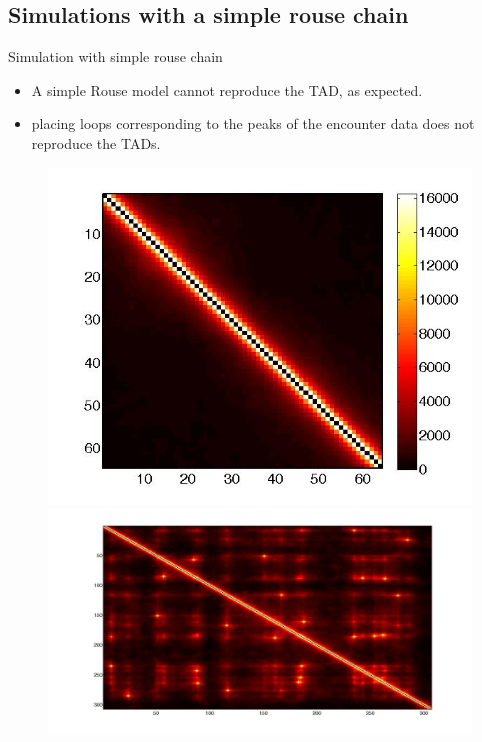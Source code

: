 \documentclass[8pt]{beamer}
\begin{document}
\subsection{Simulations with a simple rouse chain}
\begin{frame}{Simulation with simple rouse chain}
\begin{itemize}
\item A simple Rouse model cannot reproduce the TAD, as expected.
\item placing loops corresponding to the peaks of the encounter data does not reproduce the TADs. 
\end{itemize}
\begin{figure}[H]
\includegraphics[scale=0.15]{encounterMatrix64Beads}
\includegraphics[scale=0.08]{meanEncounterMatrixOfSimulatingTADEandDWithLoops}
\end{figure}
\end{frame}
\end{document}
